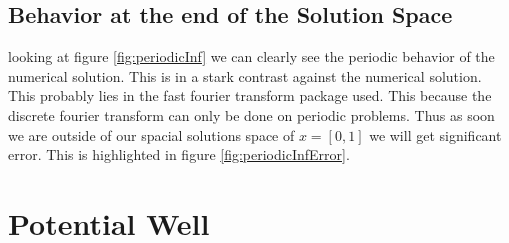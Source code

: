 \documentclass[11pt]{article}
\newlength\figureheight
\newlength\figurewidth
\newif\iftikz
\begin{document}
\subsection{Behavior at the end of the Solution Space}
looking at figure \ref{fig:periodicInf} we can clearly see the periodic behavior of the numerical solution. This is in a stark contrast against the numerical solution. This probably lies in the fast fourier transform package used. This because the discrete fourier transform can only be done on periodic problems. Thus as soon we are outside of our spacial solutions space of $x=[0,1]$ we will get significant error. This is highlighted in figure \ref{fig:periodicInfError}.
\iftikz
\begin{figure}[H]
	\centering
	\begin{subfigure}{.9\linewidth}
		\setlength\figureheight{.5\linewidth} 
		\setlength\figurewidth{.9\linewidth}
		
		\caption{The numerical solution ($\psi_n$) plotted against the analytical solution ($\psi_a$).}
		\label{fig:periodicInfPlot}
	\end{subfigure}
	\begin{subfigure}{.9\linewidth}
		\setlength\figureheight{.5\linewidth} 
		\setlength\figurewidth{.9\linewidth}
		
		\caption{The error is defined as the difference between the analytical solution and numerical solution.}
		\label{fig:periodicInfError}
	\end{subfigure}
	\label{fig:smallError}
	\caption{The numerical and analytical solution as it passes its solution space of $x=[0,1]$. One can clearly see in figure \ref{fig:periodicInfPlot} that the numerical solution is periodic. The error caused by this is highlighted in figure \ref{fig:periodicInfError}}
\end{figure}
\fi
\section{Potential Well}
\end{document}
